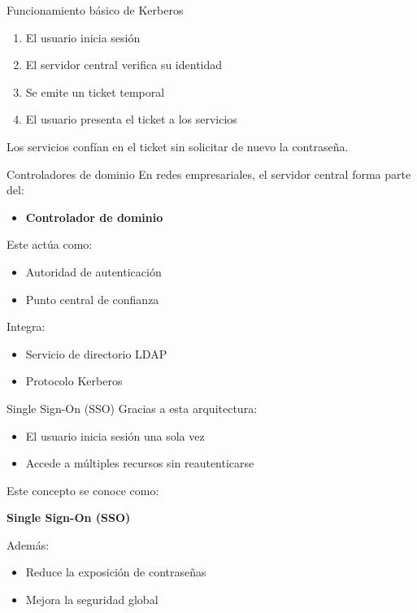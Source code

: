 \documentclass{beamer}
\begin{document}
\begin{frame}{Funcionamiento básico de Kerberos}
\begin{enumerate}
    \item El usuario inicia sesión
    \item El servidor central verifica su identidad
    \item Se emite un ticket temporal
    \item El usuario presenta el ticket a los servicios
\end{enumerate}

\vspace{0.2cm}
Los servicios confían en el ticket sin solicitar de nuevo la contraseña.
\end{frame}

\begin{frame}{Controladores de dominio}
En redes empresariales, el servidor central forma parte del:
\begin{itemize}
    \item \textbf{Controlador de dominio}
\end{itemize}

\vspace{0.3cm}
Este actúa como:
\begin{itemize}
    \item Autoridad de autenticación
    \item Punto central de confianza
\end{itemize}

\vspace{0.3cm}
Integra:
\begin{itemize}
    \item Servicio de directorio LDAP
    \item Protocolo Kerberos
\end{itemize}
\end{frame}

\begin{frame}{Single Sign-On (SSO)}
Gracias a esta arquitectura:
\begin{itemize}
    \item El usuario inicia sesión una sola vez
    \item Accede a múltiples recursos sin reautenticarse
\end{itemize}

\vspace{0.3cm}
Este concepto se conoce como:
\begin{center}
\textbf{Single Sign-On (SSO)}
\end{center}

\vspace{0.2cm}
Además:
\begin{itemize}
    \item Reduce la exposición de contraseñas
    \item Mejora la seguridad global
\end{itemize}
\end{frame}
\end{document}
